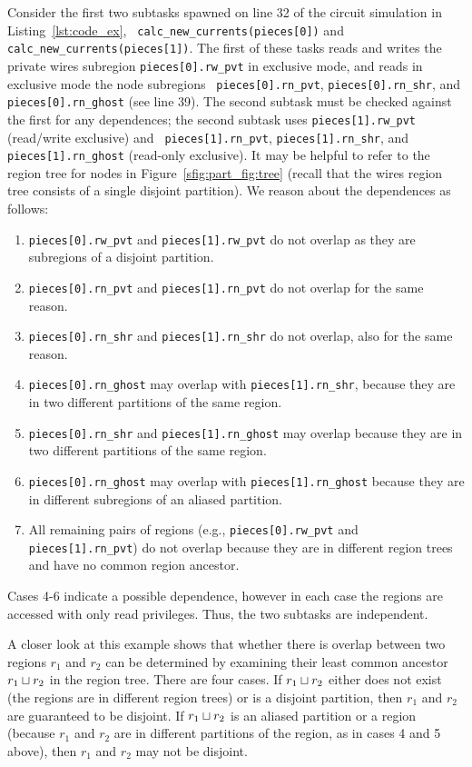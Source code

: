 Consider the first two subtasks spawned on line 32 of the circuit
simulation in Listing~\ref{lst:code_ex}, {\tt
calc\_new\_currents(pieces[0])} and {\tt
calc\_new\_currents(pieces[1])}.  The first of these tasks reads and
writes the private wires subregion {\tt pieces[0].rw\_pvt} in
exclusive mode, and reads in exclusive mode the node subregions {\tt
pieces[0].rn\_pvt}, {\tt pieces[0].rn\_shr}, and {\tt
pieces[0].rn\_ghost} (see line 39).  The second subtask must be
checked against the first for any dependences; the second subtask uses
{\tt pieces[1].rw\_pvt} (read/write exclusive) and {\tt
pieces[1].rn\_pvt}, {\tt pieces[1].rn\_shr}, and {\tt pieces[1].rn\_ghost} (read-only exclusive).
It may be helpful to refer to the region tree for nodes in Figure~\ref{sfig:part_fig:tree} (recall that the wires region tree consists of a single disjoint partition).  We reason about the dependences as follows:
\begin{enumerate}
\item {\tt pieces[0].rw\_pvt} and {\tt pieces[1].rw\_pvt} do not overlap as they are subregions of a disjoint partition.
\item {\tt pieces[0].rn\_pvt} and {\tt pieces[1].rn\_pvt} do not overlap for the same reason.
\item {\tt pieces[0].rn\_shr} and {\tt pieces[1].rn\_shr} do not overlap, also for the same reason.
\item {\tt pieces[0].rn\_ghost} may overlap with {\tt pieces[1].rn\_shr}, because they are in two different
  partitions of the same region.
\item {\tt pieces[0].rn\_shr} and {\tt pieces[1].rn\_ghost} may overlap because they are in two different
  partitions of the same region.
\item {\tt pieces[0].rn\_ghost} may overlap with {\tt pieces[1].rn\_ghost} because they are in different subregions of
an aliased partition.
\item All remaining pairs of regions (e.g., {\tt pieces[0].rw\_pvt} and {\tt pieces[1].rn\_pvt})
do not overlap because they are in different region trees and have no common region ancestor.
\end{enumerate}
Cases 4-6 indicate a possible dependence, however in each case the regions are accessed with only read privileges.  Thus, the two subtasks are independent.

A closer look at this example shows that whether there is overlap
between two regions $r_1$ and $r_2$ can be determined by examining
their least common ancestor $r_1 \sqcup r_2$ in the region tree.  
There are four cases.  If $r_1 \sqcup r_2$ either does not exist (the regions
are in different region trees) or is a disjoint partition, then $r_1$
and $r_2$ are guaranteed to be disjoint.  If $r_1 \sqcup r_2$ is an
aliased partition or a region (because $r_1$ and $r_2$ are in
different partitions of the region, as in cases 4 and 5
above), then $r_1$ and $r_2$ may not be disjoint.

